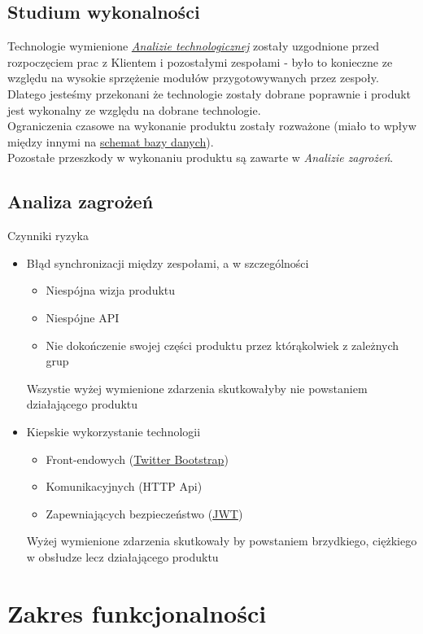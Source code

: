 \documentclass[polish,12pt]{aghthesis}
\begin{document}
\subsection{Studium wykonalności}
Technologie wymienione \hyperref[subsec:analizaTechnologiczna]{\emph{Analizie technologicznej}} zostały uzgodnione przed rozpoczęciem prac z Klientem i pozostałymi zespołami - było to konieczne ze względu na wysokie sprzężenie modułów przygotowywanych przez zespoły. Dlatego jesteśmy przekonani że technologie zostały dobrane poprawnie i produkt jest wykonalny ze względu na dobrane technologie. \\
Ograniczenia czasowe na wykonanie produktu zostały rozważone (miało to wpływ między innymi na \hyperref[subsec:wykorzystane-technologie-baza]{schemat bazy danych}). \\
Pozostałe przeszkody w wykonaniu produktu są zawarte w \emph{Analizie zagrożeń}.

\subsection{Analiza zagrożeń}
Czynniki ryzyka
\begin{itemize}
  \item Błąd synchronizacji między zespołami, a w szczególności \begin{itemize}
    \item Niespójna wizja produktu
    \item Niespójne API
    \item Nie dokończenie swojej części produktu przez którąkolwiek z zależnych grup
  \end{itemize}
  Wszystie wyżej wymienione zdarzenia skutkowałyby nie powstaniem działającego produktu
  \item Kiepskie wykorzystanie technologii \begin{itemize}
    \item Front-endowych (\href{https://getbootstrap.com/}{Twitter Bootstrap})
    \item Komunikacyjnych (HTTP Api)
    \item Zapewniających bezpieczeństwo (\href{https://jwt.io/}{JWT})
  \end{itemize}
  Wyżej wymienione zdarzenia skutkowały by powstaniem brzydkiego, ciężkiego w obsłudze lecz działającego produktu
\end{itemize}
\section{Zakres funkcjonalności}
\label{sec:zakres-funkcjonalnosci}
\end{document}
